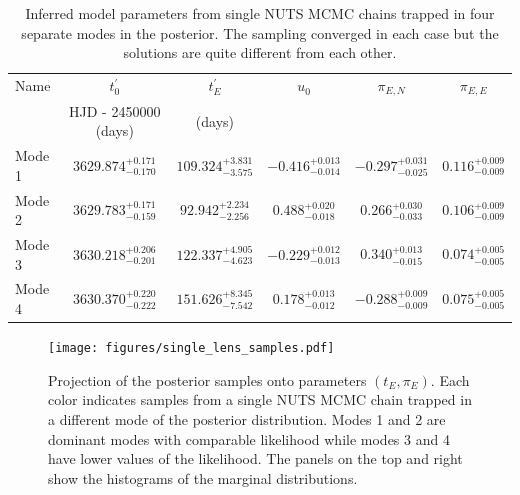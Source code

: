 \documentclass[12pt,dvipsnames]{report}
\begin{document}
\begin{table}[h!]
\centering
\begin{tabular}{l c c c c c} 
 \toprule
Name & $t_0^\prime$ & $t_E^\prime$ & $u_0$ & $\pi_{E,N}$ &$\pi_{E,E}$ \\
&HJD - 2450000 (days) & (days) &&&\\
 \midrule
 Mode 1 & $3629.874_{-0.170}^{+0.171}$&$109.324_{-3.575}^{+3.831}$&$-0.416_{-0.014}^{+0.013}$&$-0.297_{-0.025}^{+0.031}$&$0.116_{-0.009}^{+0.009}$\\
 Mode 2 & $3629.783_{-0.159}^{+0.171}$&$92.942_{-2.256}^{+2.234}$&$0.488_{-0.018}^{+0.020}$&$0.266_{-0.033}^{+0.030}$&$0.106_{-0.009}^{+0.009}$\\
 Mode 3 & $3630.218_{-0.201}^{+0.206}$&$122.337_{-4.623}^{+4.905}$&$-0.229_{-0.013}^{+0.012}$&$0.340_{-0.015}^{+0.013}$&$0.074_{-0.005}^{+0.005}$\\
 Mode 4 & $3630.370_{-0.222}^{+0.220}$ & $151.626_{-7.542}^{+8.345}$ & $0.178_{-0.012}^{+0.013}$ & $-0.288_{-0.009}^{+0.009}$ & $0.075_{-0.005}^{+0.005}$\\
\bottomrule
\end{tabular}
\caption{
    Inferred model parameters from single NUTS MCMC chains trapped in four separate modes in 
    the posterior. The sampling converged in each case but the solutions are quite 
    different from each other.
}
\label{tab:parameters_four_chains}
\end{table}

\begin{figure}[t]
    \begin{centering}
        \texttt{[image: figures/single\_lens\_samples.pdf]}
        \caption{
            Projection of the posterior samples onto parameters $(t_E, \pi_E)$.
            Each color indicates samples from a single NUTS MCMC chain trapped 
            in a different mode of the posterior distribution. Modes 1 and 2 
            are dominant modes with comparable likelihood while modes 3 and 4
            have lower values of the likelihood. The panels on the top and right 
            show the histograms of the marginal distributions.
        }
            \label{fig:ogle_lightcurve_fit_samples}
    \end{centering}
\end{figure}
\end{document}
